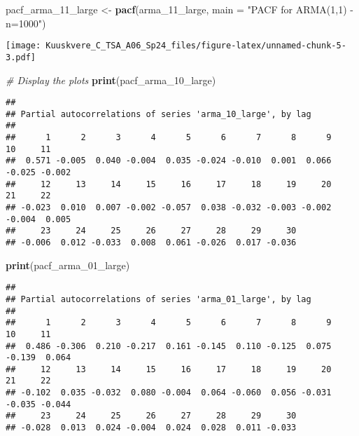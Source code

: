 \documentclass[
]{article}
\newenvironment{Shaded}{\begin{snugshade}}{\end{snugshade}}
\newcommand{\AttributeTok}[1]{\textcolor[rgb]{0.13,0.29,0.53}{#1}}
\newcommand{\CommentTok}[1]{\textcolor[rgb]{0.56,0.35,0.01}{\textit{#1}}}
\newcommand{\FunctionTok}[1]{\textcolor[rgb]{0.13,0.29,0.53}{\textbf{#1}}}
\newcommand{\NormalTok}[1]{#1}
\newcommand{\OtherTok}[1]{\textcolor[rgb]{0.56,0.35,0.01}{#1}}
\newcommand{\StringTok}[1]{\textcolor[rgb]{0.31,0.60,0.02}{#1}}
\begin{document}
\begin{Shaded}
\begin{Highlighting}[]
\NormalTok{pacf\_arma\_11\_large }\OtherTok{\textless{}{-}} \FunctionTok{pacf}\NormalTok{(arma\_11\_large, }\AttributeTok{main =} \StringTok{"PACF for ARMA(1,1) {-} n=1000"}\NormalTok{)}
\end{Highlighting}
\end{Shaded}

\texttt{[image: Kuuskvere\_C\_TSA\_A06\_Sp24\_files/figure-latex/unnamed-chunk-5-3.pdf]}

\begin{Shaded}
\begin{Highlighting}[]
\CommentTok{\# Display the plots}
\FunctionTok{print}\NormalTok{(pacf\_arma\_10\_large)}
\end{Highlighting}
\end{Shaded}

\begin{verbatim}
## 
## Partial autocorrelations of series 'arma_10_large', by lag
## 
##      1      2      3      4      5      6      7      8      9     10     11 
##  0.571 -0.005  0.040 -0.004  0.035 -0.024 -0.010  0.001  0.066 -0.025 -0.002 
##     12     13     14     15     16     17     18     19     20     21     22 
## -0.023  0.010  0.007 -0.002 -0.057  0.038 -0.032 -0.003 -0.002 -0.004  0.005 
##     23     24     25     26     27     28     29     30 
## -0.006  0.012 -0.033  0.008  0.061 -0.026  0.017 -0.036
\end{verbatim}

\begin{Shaded}
\begin{Highlighting}[]
\FunctionTok{print}\NormalTok{(pacf\_arma\_01\_large)}
\end{Highlighting}
\end{Shaded}

\begin{verbatim}
## 
## Partial autocorrelations of series 'arma_01_large', by lag
## 
##      1      2      3      4      5      6      7      8      9     10     11 
##  0.486 -0.306  0.210 -0.217  0.161 -0.145  0.110 -0.125  0.075 -0.139  0.064 
##     12     13     14     15     16     17     18     19     20     21     22 
## -0.102  0.035 -0.032  0.080 -0.004  0.064 -0.060  0.056 -0.031 -0.035 -0.044 
##     23     24     25     26     27     28     29     30 
## -0.028  0.013  0.024 -0.004  0.024  0.028  0.011 -0.033
\end{verbatim}
\end{document}
